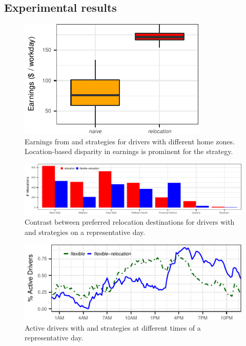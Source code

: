 \fi

\subsection{Experimental results}

\begin{figure}
	\includegraphics{figures/earnings_heatmap.pdf}
	\caption{Earnings from {\naive} and {\relocation} strategies for drivers with different home zones. Location-based disparity in earnings is prominent for the {\naive} strategy.}
	\label{fig:earnings_heatmap}
\end{figure}

\begin{figure}
	\centering
	\includegraphics{figures/relocation_endzones.pdf}
	\caption{Contrast between preferred relocation destinations for drivers with 
	{\relocation} and {\relocationflexible} strategies on a representative day.}
	\label{fig:relocation_endzones}
\end{figure}

\begin{figure}[h]
	\centering
	\includegraphics{figures/simulated_schedules.pdf}
	\caption{Active drivers with {\flexible} and {\relocationflexible}
	strategies at different times of a representative day.}
	\label{fig:simulated_schedules}
\end{figure}

